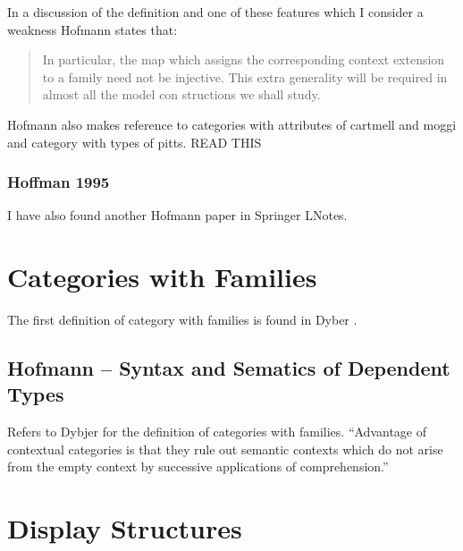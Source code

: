 \documentclass[14pt,a4paper]{scrartcl}
\begin{document}
\noindent
In a discussion of the definition and one of these features which I consider a weakness Hofmann states that:
\begin{quote}
In particular, 
the map which assigns the corresponding context extension to a family need not 
be injective. This extra generality will be required in almost all the model con­ 
structions we shall study. 
\end{quote}

Hofmann also makes reference to categories with attributes of cartmell and moggi and category with types of pitts.
READ THIS 

\subsubsection{Hoffman 1995}
I have also found another Hofmann paper \cite{hofmann95} in Springer LNotes.

\section{Categories with Families}

The first definition of category with families is found in Dyber \cite{dybjer96}.

\subsection{Hofmann -- Syntax and Sematics of Dependent Types}
Refers to Dybjer \cite{dybjer96} for the definition of categories with families.
``Advantage of contextual categories is that they rule out semantic contexts which do not arise from the empty context by successive applications of comprehension.''

\section{Display Structures}
\end{document}
